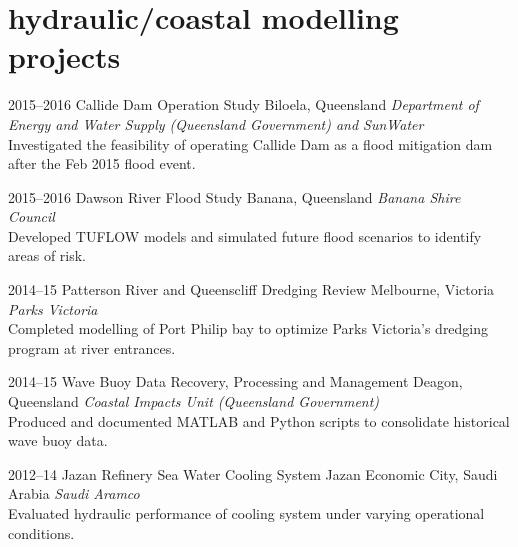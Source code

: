 

\section{hydraulic/coastal modelling projects}

\begin{entrylist}
\entry%
{2015--2016}
{Callide Dam Operation Study}
{Biloela, Queensland}
{\emph{Department of Energy and Water Supply (Queensland Government) and SunWater} \\
Investigated the feasibility of operating Callide Dam as a flood mitigation dam after the Feb 2015 flood event.}
\end{entrylist}

\begin{entrylist}
\entry%
{2015--2016}
{Dawson River Flood Study}
{Banana, Queensland}
{\emph{Banana Shire Council} \\
Developed TUFLOW models and simulated future flood scenarios to identify areas of risk.}
\end{entrylist}


\begin{entrylist}
\entry%
{2014--15}
{Patterson River and Queenscliff Dredging Review}
{Melbourne, Victoria}
{\emph{Parks Victoria} \\
Completed modelling of Port Philip bay to optimize Parks Victoria's dredging program at river entrances.}
\end{entrylist}

\begin{entrylist}
\entry%
{2014--15}
{Wave Buoy Data Recovery, Processing and Management}
{Deagon, Queensland}
{\emph{Coastal Impacts Unit (Queensland Government)} \\
Produced and documented MATLAB and Python scripts to consolidate historical wave buoy data.}
\end{entrylist}

\begin{entrylist}
\entry%
{2012--14}
{Jazan Refinery Sea Water Cooling System}
{Jazan Economic City, Saudi Arabia}
{\emph{Saudi Aramco} \\
Evaluated hydraulic performance of cooling system under varying operational conditions.}
\end{entrylist}


